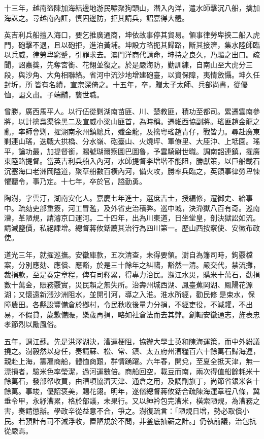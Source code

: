 \begin{pinyinscope}
十三年，越南盜陳加海結邊地游民嘯聚狗頭山，潛入內洋，遣水師擊沉八船，擒加海誅之。尋越南內訌，慎固邊防，拒其請兵，詔嘉得大體。

英吉利兵船擅入海口，要乞推廣通商，坤依故事停其貿易。領事律勞卑挾二船入虎門，砲擊不退，且以砲拒，進泊黃埔。坤設方略扼其歸路，斷其接濟，集水陸師臨以兵威，律勞卑窮蹙，引罪求去。澳門洋商代請命，坤持之良久，乃驅之出口。疏聞，詔嘉獎，先奪宮銜、花翎並復之。於是嚴海防，勤訓練，自南山至大虎分三段，與沙角、大角相聯絡。省河中流沙地增建砲臺，以資保障，夷情斂懾。坤久任封圻，所皆有名績，宣宗深倚之。十五年，卒，贈太子太師、兵部尚書，從優恤，謚文肅。子端黼，襲世職。

曾勝，廣西馬平人。以行伍從剿湖南苗匪、川、楚教匪，積功至都司。累遷雲南參將，以計擒梟渠徐黑二及宣威小梁山匪首，為時稱。遷維西協副將。瑤匪趙金龍之亂，率師會剿，擢湖南永州鎮總兵，殲金龍，及擒粵瑤趙青仔，戰皆力。尋赴廣東剿連山瑤，迭戰大拱橋、分水嶺、砲臺山、火燒坪、軍僚里、大厓沖、上坻園。瑤平，論功最，加提督銜，賜號瑚爾察圖巴圖魯，予雲騎尉世職。調南韶連鎮，擢廣東陸路提督。當英吉利兵船入內河，水師提督李增堦不能阻，勝獻策，以巨船載石沉塞海口老洲岡隘道，聚草船數百橫內河，備火攻，勝率兵臨之，英領事律勞卑悚懼聽令，事乃定。十七年，卒於官，謚勤勇。

陶澍，字雲汀，湖南安化人。嘉慶七年進士，選庶吉士，授編修，遷御史、給事中。疏劾吏部重簽，河工冒濫，及外省吏治積弊。巡中城，決滯獄八百有奇。巡南漕，革陋規，請濬京口運河。二十四年，出為川東道，日坐堂皇，剖決獄訟如流。請減鹽價，私絕課增。總督蔣攸銛薦其治行為四川第一。歷山西按察使、安徽布政使。

道光三年，就擢巡撫。安徽庫款，五次清查，未得要領。澍自為籓司時，鉤覈檔案，分別應劾、應償、應豁，於是三十餘年之糾轕，豁然一清。嚴交代，禁流攤，裁捐款，至是奏定章程，俾有司釋累，得專力治民。瀕江水災，購米十萬石，勸捐數十萬金，賑務覈實，災民賴之無失所。治壽州城西湖、鳳臺蕉岡湖、鳳陽花源湖；又懷遠新漲沙洲阻水，並開引河，導之入淮。淮水所經，勸民修是束水，保障農田。各縣設豐備倉於鄉村，令民秋收後量力分捐，不經吏役，不減糶，不出易，不假貸，歲歉備賑，樂歲再捐，略如社倉法而去其弊。創輯安徽通志，旌表忠孝節烈以勵風俗。

五年，調江蘇。先是洪澤湖決，漕運梗阻，協辦大學士英和陳海運策，而中外紛議撓之。澍毅然以身任，奏請蘇、松、常、鎮、太五府州漕糧百六十餘萬石歸海運，親赴上海，籌雇商船，體恤商艱，群情踴躍。六年春，開兌，至夏全抵天津，無一漂損者，驗米色率瑩潔，過河運數倍。商船回空，載豆而南，兩次得值船餘耗米十餘萬石，發部帑收買，由漕項協濟天津、通倉之用，及調劑旗丁，尚節省銀米各十餘萬。事竣，優詔褒美，賜花翎。明年，遂偕總督蔣攸銛合疏陳海運章程八條，冀垂令甲，永紓漕累，格於部議，未果行。又以紳衿包完漕米，橫索陋規，為漕務之害，奏請懲辦。學政辛從益意不合，爭之。澍復疏言：「陋規日增，勢必取償小民。若預計有司不減浮收，置陋規於不問，非釜底抽薪之計。」仍執前議，治包抗從嚴焉。


\end{pinyinscope}
